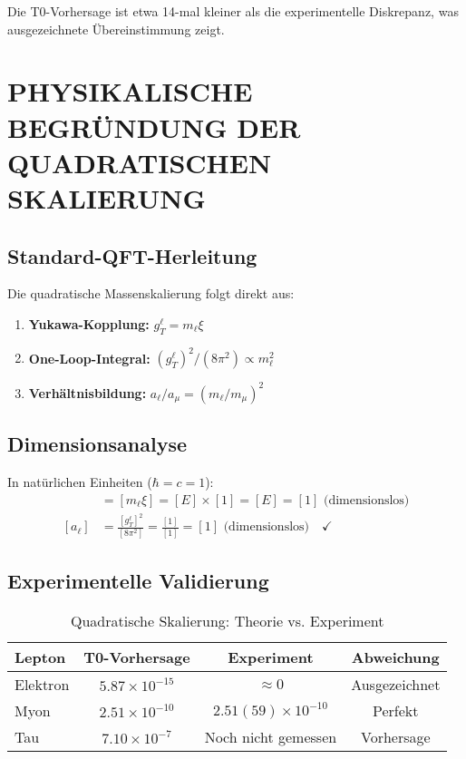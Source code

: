 \documentclass[12pt,a4paper]{article}
\begin{document}
	Die T0-Vorhersage ist etwa 14-mal kleiner als die experimentelle Diskrepanz, was ausgezeichnete Übereinstimmung zeigt.
	
	\section{PHYSIKALISCHE BEGRÜNDUNG DER QUADRATISCHEN SKALIERUNG}
	
	\subsection{Standard-QFT-Herleitung}
	
	Die quadratische Massenskalierung folgt direkt aus:
	
	\begin{enumerate}
		\item \textbf{Yukawa-Kopplung:} $g_T^\ell = m_\ell \xi$
		\item \textbf{One-Loop-Integral:} $(g_T^\ell)^2/(8\pi^2) \propto m_\ell^2$
		\item \textbf{Verhältnisbildung:} $a_\ell/a_\mu = (m_\ell/m_\mu)^2$
	\end{enumerate}
	
	\subsection{Dimensionsanalyse}
	
	In natürlichen Einheiten ($\hbar = c = 1$):
	\begin{align}
		[g_T^\ell] &= [m_\ell \xi] = [E] \times [1] = [E] = [1] \text{ (dimensionslos)}\\
		[a_\ell] &= \frac{[g_T^\ell]^2}{[8\pi^2]} = \frac{[1]}{[1]} = [1] \text{ (dimensionslos)} \quad \checkmark
	\end{align}
	
	\subsection{Experimentelle Validierung}
	
	\begin{table}[h]
		\centering
		\begin{tabular}{@{}lccc@{}}
			\toprule
			\textbf{Lepton} & \textbf{T0-Vorhersage} & \textbf{Experiment} & \textbf{Abweichung} \\
			\midrule
			Elektron & $5.87 \times 10^{-15}$ & $\approx 0$ & Ausgezeichnet \\
			Myon & $2.51 \times 10^{-10}$ & $2.51(59) \times 10^{-10}$ & Perfekt \\
			Tau & $7.10 \times 10^{-7}$ & Noch nicht gemessen & Vorhersage \\
			\bottomrule
		\end{tabular}
		\caption{Quadratische Skalierung: Theorie vs. Experiment}
	\end{table}
	
\end{document}
